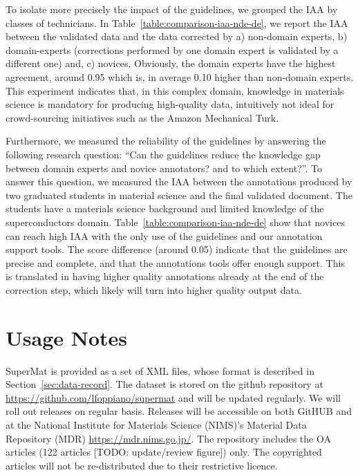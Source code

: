 \documentclass[fleqn,10pt]{wlscirep}
\begin{document}
To isolate more precisely the impact of the guidelines, we grouped the IAA by classes of technicians. 
In Table~\ref{table:comparison-iaa-nde-de}, we report the IAA between the validated data and the data corrected by a) non-domain experts, b) domain-experts (corrections performed by one domain expert is validated by a different one) and, c) novices. 
Obviously, the domain experts have the highest agreement, around 0.95 which is, in average 0.10 higher than non-domain experts. 
This experiment indicates that, in this complex domain, knowledge in materials science is mandatory for producing high-quality data, intuitively not ideal for crowd-sourcing initiatives such as the Amazon Mechanical Turk. 

Furthermore, we measured the reliability of the guidelines by answering the following research question: “Can the guidelines reduce the knowledge gap between domain experts and novice annotators? and to which extent?”. 
To answer this question, we measured the IAA between the annotations produced by two graduated students in material science and the final validated document. 
The students have a materials science background and limited knowledge of the superconductors domain. 
Table~\ref{table:comparison-iaa-nde-de} show that novices can reach high IAA with the only use of the guidelines and our annotation support tools. The score difference (around 0.05) indicate that the guidelines are precise and complete, and that the annotations tools offer enough support. 
This is translated in having higher quality annotations already at the end of the correction step, which likely will turn into higher quality output data. 

\section*{Usage Notes}

SuperMat is provided as a set of XML files, whose format is described in Section~\ref{sec:data-record}. 
The dataset is stored on the github repository at \url{https://github.com/lfoppiano/supermat} and will be updated regularly. 
We will roll out releases on regular basis. Releases will be accessible on both GitHUB and at the National Institute for Materials Science (NIMS)'s Material Data Repository (MDR) \url{https://mdr.nims.go.jp/}.
The repository includes the OA articles (122 articles [TODO: update/review figure]) only. 
The copyrighted articles will not be re-distributed due to their restrictive licence.
\end{document}
